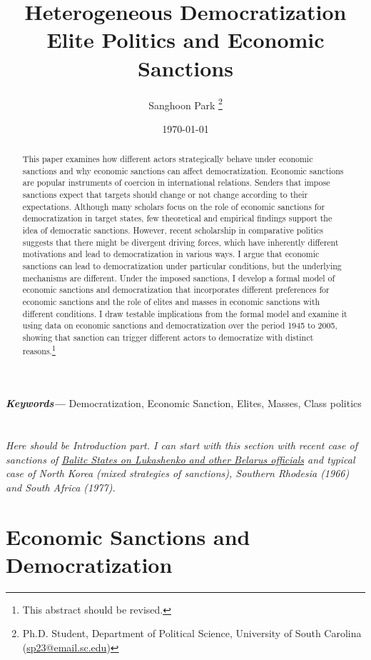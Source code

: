 \documentclass[11pt]{article}
\title{\bf Heterogeneous Democratization\\
\Large Elite Politics and Economic Sanctions}
\author{Sanghoon Park
	\thanks{\small Ph.D. Student, Department of Political Science, University of South Carolina\\
		\hspace*{1.8em}(\href{sp23@email.sc.edu}{sp23@email.sc.edu})}}
\date{\today}
\providecommand{\keywords}[1]
{
	\small	
	\hspace*{10mm}\textbf{\textit{Keywords---}} #1
}
\begin{document}
	\maketitle

\begin{abstract}
	\onehalfspacing
	\noindent This paper examines how different actors strategically behave under economic sanctions and why economic sanctions can affect democratization. Economic sanctions are popular instruments of coercion in international relations. Senders that impose sanctions expect that targets should change or not change according to their expectations. Although many scholars focus on the role of economic sanctions for democratization in target states, few theoretical and empirical findings support the idea of democratic sanctions. However, recent scholarship in comparative politics suggests that there might be divergent driving forces, which have inherently different motivations and lead to democratization in various ways. I argue that economic sanctions can lead to democratization under particular conditions, but the underlying mechanisms are different. Under the imposed sanctions, I develop a formal model of economic sanctions and democratization that incorporates different preferences for economic sanctions and the role of elites and masses in economic sanctions with different conditions. I draw testable implications from the formal model and examine it using data on economic sanctions and democratization over the period 1945 to 2005, showing that sanction can trigger different actors to democratize with distinct reasons.\footnote{This abstract should be revised.}
\end{abstract}
\keywords{Democratization, Economic Sanction, Elites, Masses, Class politics}
\newpage
\section*{}
\textit{Here should be Introduction part. I can start with this section with recent case of sanctions of \href{https://www.reuters.com/article/us-belarus-election-sanctions/baltic-states-to-hit-lukashenko-other-belarus-officials-with-sanctions-idUSKBN25R0Z7}{Balitc States on Lukashenko and other Belarus officials} and typical case of North Korea (mixed strategies of sanctions), Southern Rhodesia (1966) and South Africa (1977).} 

\section*{Economic Sanctions and Democratization}
\end{document}
